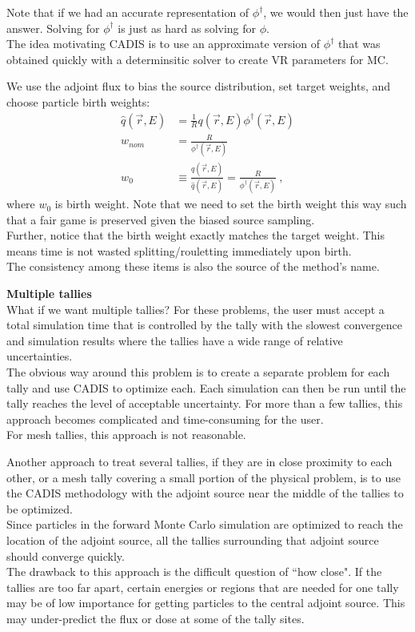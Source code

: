 \documentclass[12pt]{article}
\begin{document}
Note that if we had an accurate representation of $\phi^{\dagger}$, we would then just have the answer. Solving for $\phi^{\dagger}$ is just as hard as solving for $\phi$. \\
The idea motivating CADIS is to use an approximate version of $\phi^{\dagger}$ that was obtained quickly with a determinsitic solver to create VR parameters for MC. 

We use the adjoint flux to bias the source distribution, set target weights, and choose particle birth weights:
\begin{align*}
\hat{q}(\vec{r}, E) &= \frac{1}{R} q(\vec{r}, E)\phi^{\dagger}(\vec{r}, E) \\
w_{nom} &= \frac{R}{\phi^{\dagger}(\vec{r}, E)}\\
w_0 &\equiv \frac{q(\vec{r}, E)}{\hat{q}(\vec{r}, E)} = \frac{R}{\phi^{\dagger}(\vec{r}, E)}\:,
\end{align*}
%
where $w_0$ is birth weight. Note that we need to set the birth weight this way such that a fair game is preserved given the biased source sampling.\\
Further, notice that the birth weight exactly matches the target weight. This means time is not wasted splitting/rouletting immediately upon birth.\\
The consistency among these items is also the source of the method's name.

\textbf{Multiple tallies}\\
What if we want multiple tallies? For these problems, the user must accept a total simulation time that is controlled by the tally with the slowest convergence and simulation results where the tallies have a wide range of relative uncertainties.\\
The obvious way around this problem is to create a separate problem for each tally and use
CADIS to optimize each. Each simulation can then be run until the tally reaches the level of acceptable uncertainty. For more than a few tallies, this approach becomes complicated and time-consuming for the user. \\
For mesh tallies, this approach is not reasonable.

Another approach to treat several tallies, if they are in close proximity to each other, or a mesh tally covering a small portion of the physical problem, is to use the CADIS methodology with the adjoint source near the middle of the tallies to be optimized.\\
Since particles in the forward Monte Carlo simulation are optimized to reach the location of the adjoint source, all the tallies surrounding that adjoint source should converge quickly. \\
The drawback to this approach is the difficult question of ``how close". If the tallies are too far apart, certain energies or regions that are needed for one tally may be of low importance for getting particles to the central adjoint source. This may under-predict the flux or dose at some of the tally sites.
\end{document}
